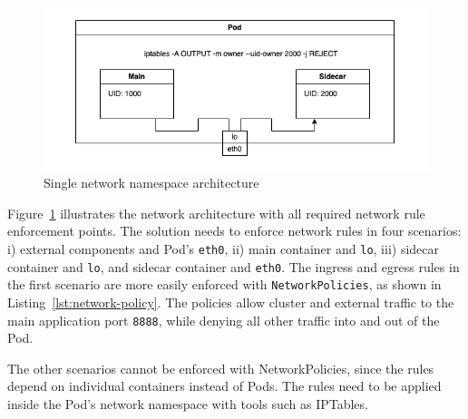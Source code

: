 \documentclass[english, 12pt, a4paper, sci, utf8, a-2b, online]{aaltothesis}
\begin{document}




\begin{figure}[h!]
  \centering
  \includegraphics[width=\linewidth]{files/iptables.png}
  \caption{Single network namespace architecture}
  \label{fig:single-net-solution}
\end{figure}

Figure~\ref{fig:single-net-solution} illustrates the network architecture with all required network rule enforcement points. The solution needs to enforce network rules in four scenarios: i) external components and Pod's \texttt{eth0}, ii) main container and \texttt{lo}, iii) sidecar container and \texttt{lo}, and sidecar container and \texttt{eth0}. The ingress and egress rules in the first scenario are more easily enforced with \texttt{NetworkPolicies}, as shown in Listing~\ref{lst:network-policy}. The policies allow cluster and external traffic to the main application port \texttt{8888}, while denying all other traffic into and out of the Pod.



The other scenarios cannot be enforced with NetworkPolicies, since the rules depend on individual containers instead of Pods. The rules need to be applied inside the Pod's network namespace with tools such as IPTables.
\end{document}
